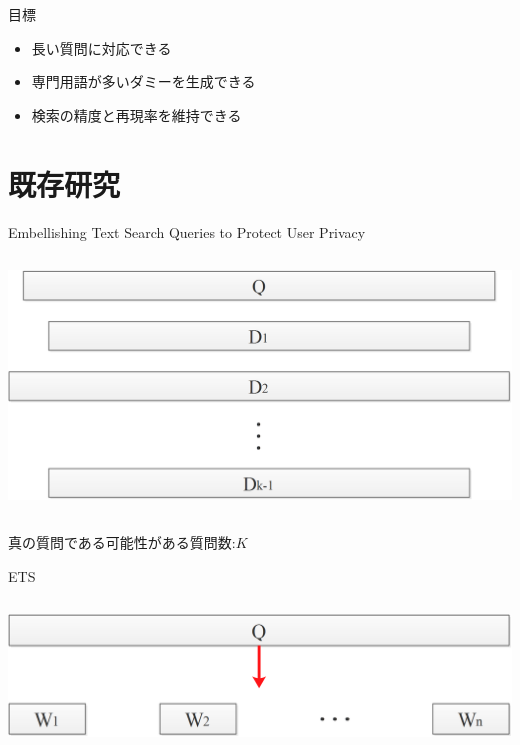 \documentclass[14pt,xcolor=dvipsnames,table,dvipdfmx]{beamer}
\begin{document}
\begin{frame}{目標}
    \begin{block}{}
    \begin{itemize}
        \item 長い質問に対応できる
        \item 専門用語が多いダミーを生成できる
		\item 検索の精度と再現率を維持できる
    \end{itemize}
    \end{block}
\end{frame}

\section{既存研究}
\begin{frame}{Embellishing Text Search Queries to Protect User Privacy \cite{pang_embellishing_2010}}
	\begin{columns}[t]
		\begin{column}{0.8\textwidth} %
			\includegraphics[width=\columnwidth]{rk6.png}
		\end{column}
	\end{columns}
	\begin{block}{}
		真の質問である可能性がある質問数:$K$	
	\end{block}
\end{frame}

\begin{frame}{ETS}
	\begin{columns}[t]
		\begin{column}{0.8\textwidth} %
			\includegraphics[width=\columnwidth]{rk7.png}
		\end{column}
	\end{columns}
\end{frame}
\end{document}
